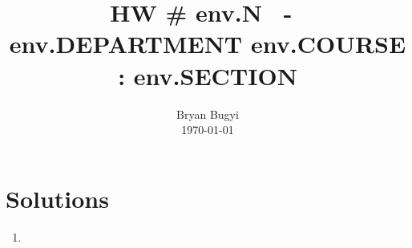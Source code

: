 \documentclass[12pt]{article}
\title{HW \#{{ env.N }}~-~{{ env.DEPARTMENT }} {{ env.COURSE }}:{{ env.SECTION }}\vspace{-0.5cm}}
\author{Bryan Bugyi\\\today}
\date{}
\begin{document}
\maketitle
\section*{Solutions}
\begin{enumerate}
   \item
\end{enumerate}
\end{document}
